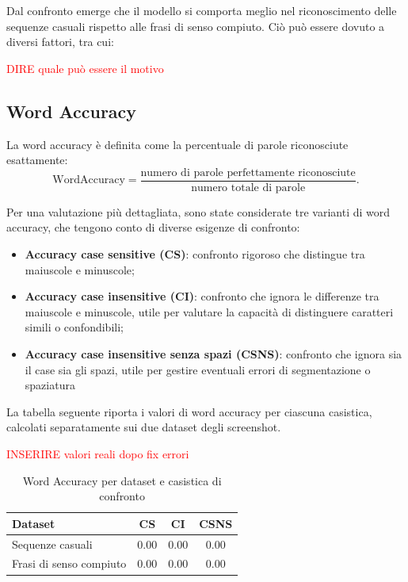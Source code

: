 Dal confronto emerge che il modello si comporta meglio nel riconoscimento delle sequenze casuali rispetto alle frasi di senso compiuto. Ciò può essere dovuto a diversi fattori, tra cui:

\textcolor{red}{DIRE quale può essere il motivo}

\subsection{Word Accuracy}
La word accuracy è definita come la percentuale di parole riconosciute esattamente:
\[
    \mathrm{WordAccuracy} = \frac{\text{numero di parole perfettamente riconosciute}}{\text{numero totale di parole}}.
\]

Per una valutazione più dettagliata, sono state considerate tre varianti di word accuracy, che tengono conto di diverse esigenze di confronto:

\begin{itemize}
    \item \textbf{Accuracy case sensitive (CS)}: confronto rigoroso che distingue tra maiuscole e minuscole;
    \item \textbf{Accuracy case insensitive (CI)}: confronto che ignora le differenze tra maiuscole e minuscole, utile per valutare la capacità di distinguere caratteri simili o confondibili;
    \item \textbf{Accuracy case insensitive senza spazi (CSNS)}: confronto che ignora sia il case sia gli spazi, utile per gestire eventuali errori di segmentazione o spaziatura
\end{itemize}

La tabella seguente riporta i valori di word accuracy per ciascuna casistica, calcolati separatamente sui due dataset degli screenshot.

\textcolor{red}{INSERIRE valori reali dopo fix errori}

\begin{table}[htbp]
    \centering
    \begin{tabular}{lccc}
        \toprule
        Dataset & CS & CI & CSNS \\
        \midrule
        Sequenze casuali & 0.00 & 0.00 & 0.00 \\
        Frasi di senso compiuto & 0.00 & 0.00 & 0.00 \\
        \bottomrule
    \end{tabular}
    \caption{Word Accuracy per dataset e casistica di confronto}
    \label{tab:word_accuracy_stats}
\end{table}